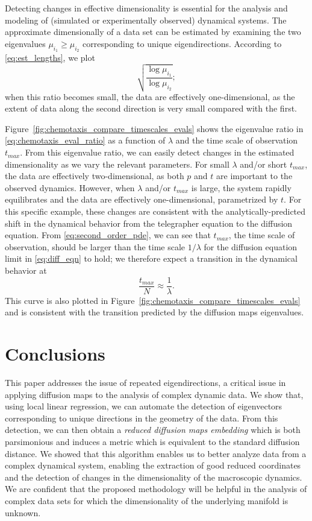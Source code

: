\documentclass[3p]{elsarticle}
\begin{document}
Detecting changes in effective dimensionality is essential for the analysis and modeling of (simulated or experimentally observed) dynamical systems.
%
The approximate dimensionally of a data set can be estimated by examining the 
two eigenvalues $\mu_{i_1} \ge \mu_{i_2}$ corresponding to unique eigendirections.
%
According to \eqref{eq:est_lengths}, we plot
\begin{equation}\label{eq:chemotaxis_eval_ratio}
 \sqrt{\frac{\log \mu_{i_1}}{\log \mu_{i_2}}} ;
\end{equation}
when this ratio becomes small, the data are effectively one-dimensional, as the extent of data along the second direction is very 
small compared with the first.

Figure~\ref{fig:chemotaxis_compare_timescales_evals} shows the eigenvalue ratio in \eqref{eq:chemotaxis_eval_ratio} as 
a function of $\lambda$ and the time scale of observation $t_{max}$.
%
From this eigenvalue ratio, we can easily detect changes in the estimated dimensionality as we vary the relevant parameters.
%
For small $\lambda$ and/or short $t_{max}$, the data are effectively two-dimensional, as both $p$ and $t$ are important to the observed dynamics.
%
However, when $\lambda$ and/or $t_{max}$ is large, the system rapidly equilibrates and the data are effectively one-dimensional, parametrized by $t$.
%
For this specific example, these changes are consistent with the analytically-predicted  shift in the dynamical behavior from the telegrapher equation to the diffusion equation.
%
From \eqref{eq:second_order_pde}, we can see that $t_{max}$, the time scale of observation, should be larger than the time scale $1/\lambda$ for the diffusion equation limit in \eqref{eq:diff_eqn} to hold; we therefore expect a transition in the dynamical behavior at
\begin{equation}
\frac{t_{max}}{N} \approx \frac{1}{\lambda}.
\end{equation}
%
This curve is also plotted in Figure~\ref{fig:chemotaxis_compare_timescales_evals} and is consistent with the transition predicted by the diffusion maps eigenvalues.

\section{Conclusions}

This paper addresses the issue of repeated eigendirections, a critical issue in applying diffusion maps to the analysis of complex dynamic data.
%
We show that, using local linear regression, we can automate the detection of eigenvectors corresponding to unique directions in the
geometry of the data.
%
From this detection, we can then obtain a {\em reduced diffusion maps embedding} which is both parsimonious and 
induces a metric which is equivalent to the standard diffusion distance.
%
We showed that this algorithm enables us to better analyze data from a complex dynamical system, 
enabling the extraction of good reduced coordinates and the detection of changes in the dimensionality of the macroscopic dynamics.
%
We are confident that the proposed methodology will be helpful in the analysis of complex data sets for which 
the dimensionality of the underlying manifold is unknown.
\end{document}
